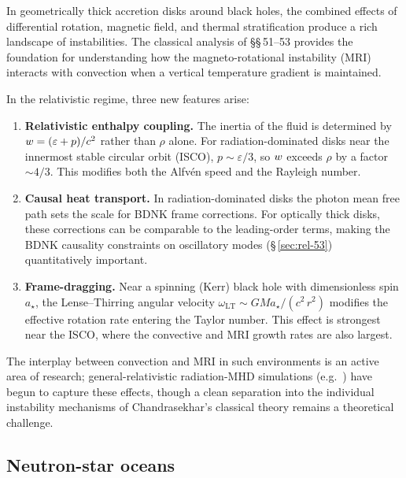 In geometrically thick accretion disks around black holes, the combined
effects of differential rotation, magnetic field, and thermal stratification
produce a rich landscape of instabilities.  The classical analysis of \S\S\,51--53
provides the foundation for understanding how the magneto-rotational
instability (MRI) interacts with convection when a vertical temperature
gradient is maintained.

In the relativistic regime, three new features arise:
\begin{enumerate}
  \item \textbf{Relativistic enthalpy coupling.}  The inertia of the fluid
    is determined by $w = (\varepsilon+p)/c^{2}$ rather than
    $\rho$ alone.  For radiation-dominated disks near the innermost
    stable circular orbit (ISCO), $p\sim\varepsilon/3$, so $w$
    exceeds $\rho$ by a factor $\sim 4/3$.  This modifies both the
    Alfv\'en speed and the Rayleigh number.

  \item \textbf{Causal heat transport.}  In radiation-dominated disks
    the photon mean free path sets the scale for BDNK frame corrections.
    For optically thick disks, these corrections can be comparable to
    the leading-order terms, making the BDNK causality constraints on
    oscillatory modes (\S\,\ref{sec:rel-53}) quantitatively important.

  \item \textbf{Frame-dragging.}  Near a spinning (Kerr) black hole with
    dimensionless spin $a_{\star}$, the Lense--Thirring angular velocity
    $\omega_{\mathrm{LT}}\sim G M a_{\star}/(c^{2}\,r^{2})$ modifies the
    effective rotation rate entering the Taylor number.  This effect is
    strongest near the ISCO, where the convective and MRI growth rates are
    also largest.
\end{enumerate}

The interplay between convection and MRI in such environments is an
active area of research; general-relativistic radiation-MHD simulations
(e.g.\ \citealt{McKinney2014,Sadowski2015}) have begun to capture these
effects, though a clean separation into the individual instability
mechanisms of Chandrasekhar's classical theory remains a theoretical
challenge.

\subsection{Neutron-star oceans}

